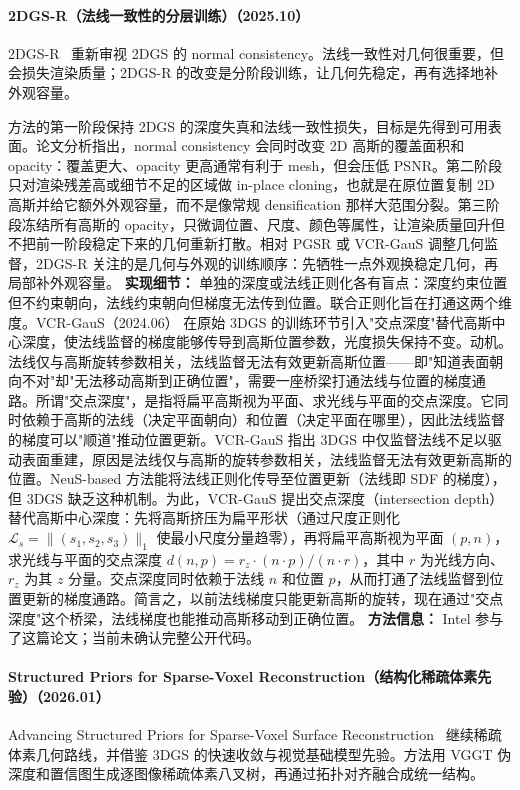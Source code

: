 \paragraph{2DGS-R（法线一致性的分层训练）（2025.10）}
2DGS-R~\cite{2510_16837} 重新审视 2DGS 的 normal consistency。法线一致性对几何很重要，但会损失渲染质量；2DGS-R 的改变是分阶段训练，让几何先稳定，再有选择地补外观容量。

方法的第一阶段保持 2DGS 的深度失真和法线一致性损失，目标是先得到可用表面。论文分析指出，normal consistency 会同时改变 2D 高斯的覆盖面积和 opacity：覆盖更大、opacity 更高通常有利于 mesh，但会压低 PSNR。第二阶段只对渲染残差高或细节不足的区域做 in-place cloning，也就是在原位置复制 2D 高斯并给它额外外观容量，而不是像常规 densification 那样大范围分裂。第三阶段冻结所有高斯的 opacity，只微调位置、尺度、颜色等属性，让渲染质量回升但不把前一阶段稳定下来的几何重新打散。相对 PGSR 或 VCR-GauS 调整几何监督，2DGS-R 关注的是几何与外观的训练顺序：先牺牲一点外观换稳定几何，再局部补外观容量。
\textbf{实现细节：} 单独的深度或法线正则化各有盲点：深度约束位置但不约束朝向，法线约束朝向但梯度无法传到位置。联合正则化旨在打通这两个维度。VCR-GauS（2024.06） 在原始 3DGS 的训练环节引入"交点深度"替代高斯中心深度，使法线监督的梯度能够传导到高斯位置参数，光度损失保持不变。动机。法线仅与高斯旋转参数相关，法线监督无法有效更新高斯位置——即"知道表面朝向不对"却"无法移动高斯到正确位置"，需要一座桥梁打通法线与位置的梯度通路。所谓"交点深度"，是指将扁平高斯视为平面、求光线与平面的交点深度。它同时依赖于高斯的法线（决定平面朝向）和位置（决定平面在哪里），因此法线监督的梯度可以"顺道"推动位置更新。VCR-GauS 指出 3DGS 中仅监督法线不足以驱动表面重建，原因是法线仅与高斯的旋转参数相关，法线监督无法有效更新高斯的位置。NeuS-based 方法能将法线正则化传导至位置更新（法线即 SDF 的梯度），但 3DGS 缺乏这种机制。为此，VCR-GauS 提出交点深度（intersection depth）替代高斯中心深度：先将高斯挤压为扁平形状（通过尺度正则化 $\mathcal{L}_s = \|(s_1, s_2, s_3)\|_1$ 使最小尺度分量趋零），再将扁平高斯视为平面 $(p, n)$，求光线与平面的交点深度 $d(n, p) = r_z \cdot (n \cdot p) / (n \cdot r)$，其中 $r$ 为光线方向、$r_z$ 为其 $z$ 分量。交点深度同时依赖于法线 $n$ 和位置 $p$，从而打通了法线监督到位置更新的梯度通路。简言之，以前法线梯度只能更新高斯的旋转，现在通过"交点深度"这个桥梁，法线梯度也能推动高斯移动到正确位置。
\textbf{方法信息：} Intel 参与了这篇论文；当前未确认完整公开代码。
\paragraph{Structured Priors for Sparse-Voxel Reconstruction（结构化稀疏体素先验）（2026.01）}
Advancing Structured Priors for Sparse-Voxel Surface Reconstruction~\cite{2601_17720} 继续稀疏体素几何路线，并借鉴 3DGS 的快速收敛与视觉基础模型先验。方法用 VGGT 伪深度和置信图生成逐图像稀疏体素八叉树，再通过拓扑对齐融合成统一结构。

